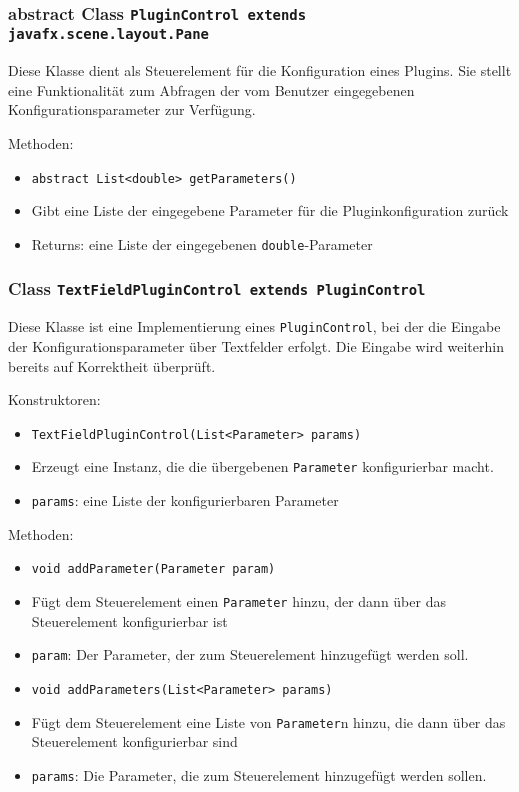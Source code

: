 \documentclass[parskip=full,11pt]{scrartcl}
\begin{document}
\subsubsection{abstract Class \texttt{PluginControl extends javafx.scene.layout.Pane}}

Diese Klasse dient als Steuerelement für die Konfiguration eines Plugins. Sie stellt eine Funktionalität zum Abfragen der vom Benutzer eingegebenen Konfigurationsparameter zur Verfügung.

Methoden:

\begin{itemize}\itemsep -10pt
	\item \texttt{abstract List<double> getParameters()}
	\item[] Gibt eine Liste der eingegebene Parameter für die Pluginkonfiguration zurück
	\item[] Returns: eine Liste der eingegebenen \texttt{double}-Parameter
\end{itemize}

\subsubsection{Class \texttt{TextFieldPluginControl extends PluginControl}}

Diese Klasse ist eine Implementierung eines  \texttt{PluginControl}, bei der die Eingabe der Konfigurationsparameter über Textfelder erfolgt. Die Eingabe wird weiterhin bereits auf Korrektheit überprüft.

Konstruktoren:

\begin{itemize}\itemsep -10pt
	\item \texttt{TextFieldPluginControl(List<Parameter> params)}
	\item[] Erzeugt eine Instanz, die die übergebenen \texttt{Parameter} konfigurierbar macht.
	\item[] \texttt{params}: eine Liste der konfigurierbaren Parameter
\end{itemize}

Methoden:

\begin{itemize}\itemsep -10pt
	\item \texttt{void addParameter(Parameter param)}
	\item[] Fügt dem Steuerelement einen \texttt{Parameter} hinzu, der dann über das Steuerelement konfigurierbar ist
	\item[] \texttt{param}: Der Parameter, der zum Steuerelement hinzugefügt werden soll.
	\item \texttt{void addParameters(List<Parameter> params)}
	\item[] Fügt dem Steuerelement eine Liste von \texttt{Parameter}n hinzu, die dann über das Steuerelement konfigurierbar sind
	\item[] \texttt{params}: Die Parameter, die zum Steuerelement hinzugefügt werden sollen.
\end{itemize}
\end{document}
